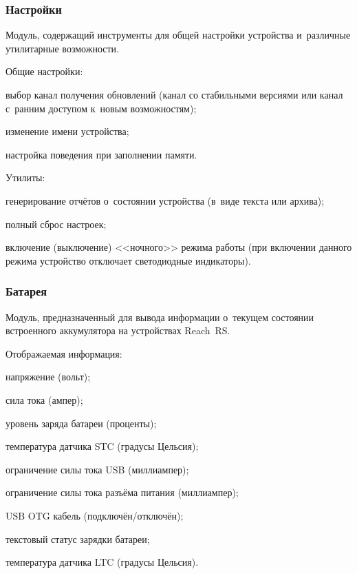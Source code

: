 \subsubsection{Настройки}

Модуль, содержащий инструменты для общей настройки устройства и~различные утилитарные возможности.

Общие настройки:
\begin{dashitemize}
  \item выбор канал получения обновлений (канал со стабильными версиями или канал с~ранним доступом к~новым возможностям);
  \item изменение имени устройства;
  \item настройка поведения при заполнении памяти.
\end{dashitemize}

Утилиты:
\begin{dashitemize}
  \item генерирование отчётов о~состоянии устройства (в~виде текста или архива);
  \item полный сброс настроек;
  \item включение (выключение) <<ночного>> режима работы (при включении данного режима устройство отключает светодиодные индикаторы).
\end{dashitemize}


\subsubsection{Батарея}

Модуль, предназначенный для вывода информации о~текущем состоянии встроенного аккумулятора на устройствах Reach~RS.

Отображаемая информация:
\begin{dashitemize}
  \item напряжение (вольт);
  \item сила тока (ампер);
  \item уровень заряда батареи (проценты);
  \item температура датчика STC (градусы Цельсия);
  \item ограничение силы тока USB (миллиампер);
  \item ограничение силы тока разъёма питания (миллиампер);
  \item USB OTG кабель (подключён/отключён);
  \item текстовый статус зарядки батареи;
  \item температура датчика LTC (градусы Цельсия).
\end{dashitemize}


